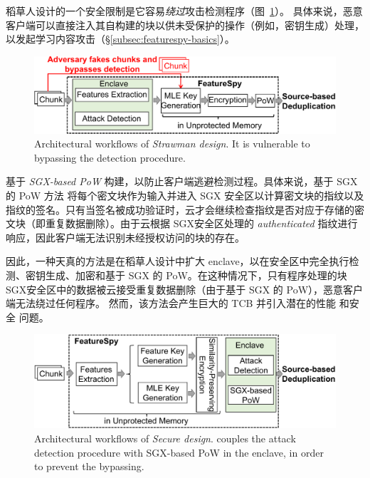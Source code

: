 稻草人设计的一个安全限制是它容易{\em 绕过}攻击检测程序（图~\ref{fig:featurespy-architecture-strawman}）。 具体来说，恶意客户端可以直接注入其自构建的块以供未受保护的操作（例如，密钥生成）处理，以发起学习内容攻击（\S\ref{subsec:featurespy-basics}）。


\begin{figure}
  \centering
  \includegraphics[width=\textwidth]{pic/featurespy/naive.pdf}
  \caption{Architectural workflows of \textit{Strawman design}. It is vulnerable to bypassing the detection procedure.}
  \label{fig:featurespy-architecture-strawman}
\end{figure}

\sysnameF 基于 {\em SGX-based PoW} \cite{ren21} 构建，以防止客户端逃避检测过程。具体来说，基于 SGX 的 PoW 方法 \cite{ren21} 将每个密文块作为输入并进入 SGX 安全区以计算密文块的指纹以及指纹的签名。只有当签名被成功验证时，云才会继续检查指纹是否对应于存储的密文块（即重复数据删除）。由于云根据 SGX安全区处理的 {\em authenticated} 指纹进行响应，因此客户端无法识别未经授权访问的块的存在。

因此，一种天真的方法是在稻草人设计中扩大 enclave，以在安全区中完全执行检测、密钥生成、加密和基于 SGX 的 PoW。在这种情况下，只有程序处理的块SGX安全区中的数据被云接受重复数据删除（由于基于 SGX 的 PoW），恶意客户端无法绕过任何程序。
然而，该方法会产生巨大的 TCB 并引入潜在的性能 \cite{arnautov16, harnik18, dinhngoc19} 和安全 \cite{lie05} 问题。

\begin{figure}
  \centering
  \includegraphics[width=\textwidth]{pic/featurespy/architecture.pdf}
  \caption{Architectural workflows of \textit{Secure design}. \sysnameF couples the attack detection procedure with SGX-based PoW \cite{ren21} in the enclave, in order to prevent the bypassing.}
  \label{fig:featurespy-architecture-secure}
\end{figure}

